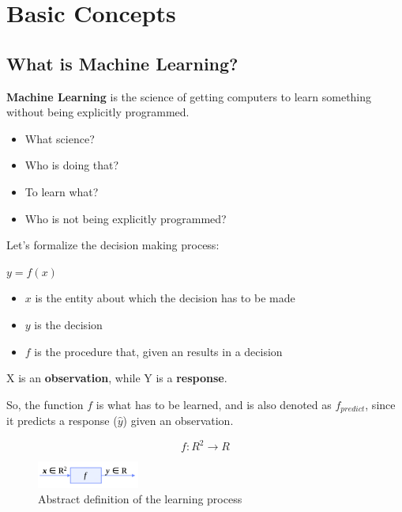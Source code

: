 \chapter{Basic Concepts}

\section*{What is Machine Learning?}

\begin{definitionblock}
\textbf{Machine Learning} is the science of getting computers to learn something without being explicitly programmed.
\end{definitionblock}

\begin{itemize}
    \item What science?
    \item Who is doing that?
    \item To learn what?
    \item Who is not being explicitly programmed?
\end{itemize}

Let's formalize the decision making process:

\begin{multicols}{2}
    \centering
    \texttt{$y = f(x)$}
    \columnbreak

    \begin{itemize}
        \item $x$ is the entity about which the decision has to be made
        \item $y$ is the decision
        \item $f$ is the procedure that, given an  results in a decision 
    \end{itemize}

\end{multicols}

X is an \textbf{observation}, while Y is a \textbf{response}.

So, the function $f$ is what has to be learned, and is also denoted as $f_{predict}$, since it predicts a response ($\hat{y}$) given an observation.

$$f: R^2 \to R$$

\begin{figure}[H]
    \centering
    \includegraphics[width=0.3\textwidth]{assets/fig1.png}
    \caption{Abstract definition of the learning process}
    \label{fig:ML1}
\end{figure}

